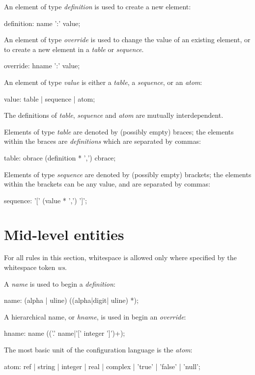 \documentclass{memarticle}
\begin{document}
An element of type \emph{definition} is used to
create a new element:
\begin{rail}
	definition: name ':' value;
\end{rail}

An element of type \emph{override} is used to
change the value of an existing element,
or to create a new element in a \emph{table} or \emph{sequence}.
\begin{rail}
  override: hname ':' value;
\end{rail}

An element of type \emph{value} is either a \emph{table},
a \emph{sequence},
or an \emph{atom}:
\begin{rail}
value: table | sequence | atom;
\end{rail}
The definitions of \emph{table}, \emph{sequence} and \emph{atom} are mutually interdependent.

Elements of type \emph{table} are denoted by (possibly empty) braces;
the elements within the braces
are \emph{definitions}
which are separated by commas:
\begin{rail}
table: obrace (definition * ',') cbrace;
\end{rail}

Elements of type \emph{sequence} are denoted by (possibly empty) brackets;
the elements within the brackets can be any value,
and are separated by commas:
\begin{rail}
sequence: '[' (value * ',') ']';
\end{rail}

\section{Mid-level entities}

For all rules in this section,
whitespace is allowed only where specified by the whitespace token \emph{ws}.

A \emph{name} is used to begin a \emph{definition}:
\begin{rail}
name: (alpha | uline) ((alpha|digit| uline) *);
\end{rail}

\break
A hierarchical name,
or \emph{hname},
is used in begin an \emph{override}:
\begin{rail}
  hname: name (('.' name|'[' integer ']')+);
\end{rail}

The most basic unit of the configuration language is the \emph{atom}:
\begin{rail}
atom: ref | string | integer | real | complex | 'true' | 'false' | 'null';
\end{rail}
\end{document}
